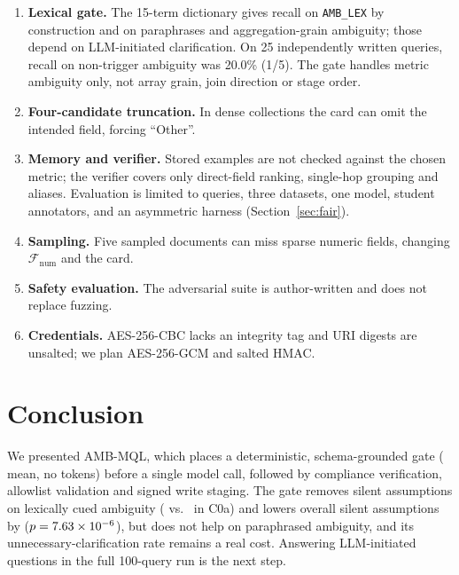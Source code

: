 \begin{enumerate}
    \item \textbf{Lexical gate.} The 15-term dictionary gives \gateRecallLexical{} recall on \texttt{AMB\_LEX} by construction and \gateRecallParaphrase{} on paraphrases and aggregation-grain ambiguity; those depend on LLM-initiated clarification. On 25 independently written queries, recall on non-trigger ambiguity was 20.0\% (1/5). The gate handles metric ambiguity only, not array grain, join direction or stage order.
    \item \textbf{Four-candidate truncation.} In dense collections the card can omit the intended field, forcing ``Other''.
    \item \textbf{Memory and verifier.} Stored examples are not checked against the chosen metric; the verifier covers only direct-field ranking, single-hop grouping and aliases. Evaluation is limited to \numTotalQueries{} queries, three datasets, one model, student annotators, and an asymmetric harness (Section~\ref{sec:fair}).
    \item \textbf{Sampling.} Five sampled documents can miss sparse numeric fields, changing $\mathcal{F}_{\text{num}}$ and the card.
    \item \textbf{Safety evaluation.} The adversarial suite is author-written and does not replace fuzzing.
    \item \textbf{Credentials.} AES-256-CBC lacks an integrity tag and URI digests are unsalted; we plan AES-256-GCM and salted HMAC.
\end{enumerate}

\section{Conclusion}
\label{sec:conclusion}

We presented AMB-MQL, which places a deterministic, schema-grounded gate (\gateLatencyMean{} mean, no tokens) before a single model call, followed by compliance verification, allowlist validation and signed write staging. The gate removes silent assumptions on lexically cued ambiguity (\eTwoECTwoSilentLex{} vs.\ \eTwoECZeroASilentLex{} in C0a) and lowers overall silent assumptions by \eTwoESilentAmbDelta{} ($p = 7.63\times 10^{-6}{}$), but does not help on paraphrased ambiguity, and its \gateUCR{} unnecessary-clarification rate remains a real cost. Answering LLM-initiated questions in the full 100-query run is the next step.



